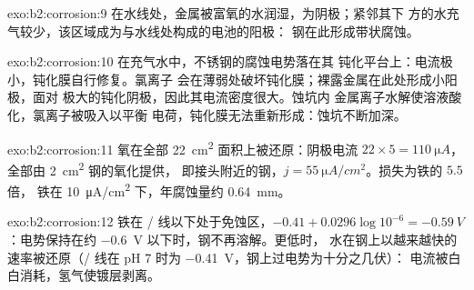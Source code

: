 \begin{solution}{exo:b2:corrosion:9}
在水线处，金属被富氧的水润湿，为阴极；紧邻其下
方的水充气较少，该区域成为与水线处构成的电池的阳极：
钢在此形成带状腐蚀。
\end{solution}

\begin{solution}{exo:b2:corrosion:10}
在充气水中，不锈钢的腐蚀电势落在其
钝化平台上：电流极小，钝化膜自行修复。氯离子
会在薄弱处破坏钝化膜；裸露金属在此处形成小阳极，面对
极大的钝化阴极，因此其电流密度很大。蚀坑内
金属离子水解使溶液酸化，氯离子被吸入以平衡
电荷，钝化膜无法重新形成：蚀坑不断加深。
\end{solution}

\begin{solution}{exo:b2:corrosion:11}
氧在全部 \qty{22}{cm^2} 面积上被还原：阴极电流 $22 \times 5 =
\qty{110}{\micro A}$，全部由 \qty{2}{cm^2} 钢的氧化提供，
即接头附近的钢，$j = \qty{55}{\micro A/cm^2}$。损失为铁的 $5.5$ 倍，
铁在 \qty{10}{\micro A/cm^2} 下，年腐蚀量约 \qty{0.64}{mm}。
\end{solution}

\begin{solution}{exo:b2:corrosion:12}
铁在 / 线以下处于免蚀区，$-0.41 + 0.0296\log 10^{-6} =
\qty{-0.59}{V}$：电势保持在约 \qty{-0.6}{V} 以下时，钢不再溶解。更低时，
水在钢上以越来越快的速率被还原（/ 线在
pH 7 时为 \qty{-0.41}{V}，钢上过电势为十分之几伏）：
电流被白白消耗，氢气使镀层剥离。
\end{solution}

